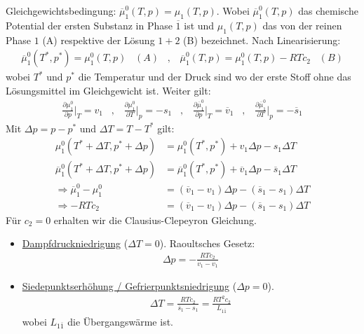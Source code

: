 Gleichgewichtsbedingung: $\overline{\mu}_1^0 (T,p) = \mu_1 (T,p)$. Wobei
$\overline{\mu}_1^0 (T,p)$ das chemische Potential der ersten Substanz in Phase
$\overline{1}$ ist und $\mu_1 (T,p)$ das von der reinen Phase $1$ (A) respektive der
Lösung $1+2$ (B) bezeichnet. Nach Linearisierung:
\begin{align*}
    \overline{\mu}_1^0 (T^\ast,p^\ast) = \mu_1^0 (T,p) \hspace{10pt} (A)
    \hspace{10pt} , \hspace{10pt}
    \overline{\mu}_1^0 (T,p) = \mu_1^0 (T,p) - R T c_2 \hspace{10pt} (B)
\end{align*}
wobei $T^\ast$ und $p^\ast$ die Temperatur und der Druck sind wo der erste Stoff ohne
das Lösungsmittel im Gleichgewicht ist. Weiter gilt:
\begin{align*}
    \frac{\partial \mu_1^0}{\partial p} \Big|_T = v_1
    \hspace{10pt} , \hspace{10pt}
    \frac{\partial \mu_1^0}{\partial T} \Big|_p = - s_1
    \hspace{10pt} , \hspace{10pt}
    \frac{\partial \overline{\mu}_1^0}{\partial p} \Big|_T = \overline{v}_1
    \hspace{10pt} , \hspace{10pt}
    \frac{\partial \overline{\mu}_1^0}{\partial T} \Big|_p = - \overline{s}_1
\end{align*}
Mit $\Delta p = p - p^\ast$ und $\Delta T = T-T^\ast$ gilt:
\begin{align*}
    \mu_1^0 (T^\ast + \Delta T,p^\ast + \Delta p) &= \mu_1^0 (T^\ast,p^\ast) + v_1 \Delta p - s_1 \Delta T
    \\
    \overline{\mu}_1^0 (T^\ast + \Delta T,p^\ast + \Delta p) &= \overline{\mu}_1^0 (T^\ast,p^\ast) + \overline{v}_1 \Delta p - \overline{s}_1 \Delta T
    \\
    \Rightarrow \overline{\mu}_1^0 - \mu_1^0 &= (\overline{v}_1 - v_1) \Delta p - (\overline{s}_1 - s_1) \Delta T
    \\
    \Rightarrow - R T c_2 &= (\overline{v}_1 - v_1) \Delta p - (\overline{s}_1 - s_1) \Delta T
\end{align*}
Für $c_2 = 0$ erhalten wir die Clausius-Clepeyron Gleichung.
\begin{itemize}
    \item \underline{Dampfdruckniedrigung} ($\Delta T = 0$). Raoultsches Gesetz:
        \begin{align*}
            \Delta p = - \frac{R T c_2}{\overline{v}_1 - v_1}
        \end{align*}
    \item \underline{Siedepunktserhöhung / Gefrierpunktsniedrigung} ($\Delta p = 0$).
        \begin{align*}
            \Delta T = \frac{R T c_2}{\overline{s}_1 - s_1} = \frac{R T^2 c_2}{L_{1\overline{1}}}
        \end{align*}
        wobei $L_{1 \overline{1}}$ die Übergangswärme ist.
\end{itemize}

